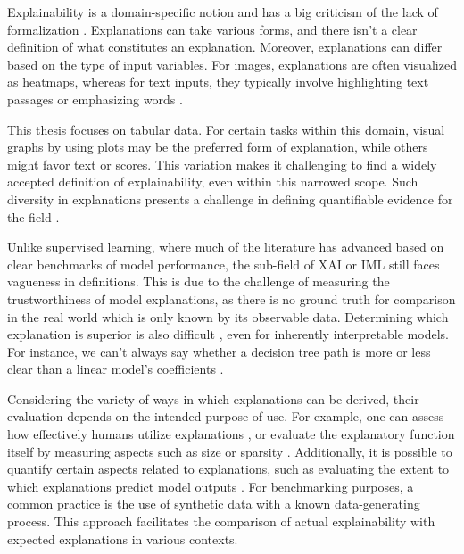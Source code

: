 Explainability is a domain-specific notion and has a big criticism of the lack of formalization \cite{Rudin2019StopInstead,Watson2022ConceptualLearning,Lipton2018TheInterpretability}. Explanations can take various forms, and there isn't a clear definition of what constitutes an explanation. Moreover, explanations can differ based on the type of input variables. For images, explanations are often visualized as heatmaps, whereas for text inputs, they typically involve highlighting text passages or emphasizing words \cite{Molnar2022Model-agnosticLearning}.

This thesis focuses on tabular data. For certain tasks within this domain, visual graphs by using plots may be the preferred form of explanation, while others might favor text or scores. This variation makes it challenging to find a widely accepted definition of explainability, even within this narrowed scope. Such diversity in explanations presents a challenge in defining quantifiable evidence for the field \cite{Doshi-Velez2017TowardsLearning}. 

Unlike supervised learning, where much of the literature has advanced based on clear benchmarks of model performance, the sub-field of \gls{XAI} or \gls{IML} still faces vagueness in definitions. This is due to the challenge of measuring the trustworthiness of model explanations, as there is no ground truth for comparison in the real world which is only known by its observable data. Determining which explanation is superior is also difficult \cite{Arya2019OneTechniques}, even for inherently interpretable models. For instance, we can't always say whether a decision tree path is more or less clear than a linear model's coefficients \cite{Molnar2022Model-agnosticLearning}.

Considering the variety of ways in which explanations can be derived, their evaluation depends on the intended purpose of use. For example, one can assess how effectively humans utilize explanations \cite{Ehsan2021OperationalizingAI,Wang2019DesigningAI}, or evaluate the explanatory function itself by measuring aspects such as size or sparsity \cite{Yang2017ScalableLists, Ustun2016SupersparseSystems, Claassen2013LearningNP-hard}. Additionally, it is possible to quantify certain aspects related to explanations, such as evaluating the extent to which explanations predict model outputs \cite{Chen2022Use-Case-GroundedEvaluation, Lakkaraju2016InterpretableSets}. For benchmarking purposes, a common practice is the use of synthetic data with a known data-generating process. This approach facilitates the comparison of actual explainability with expected explanations in various contexts.

